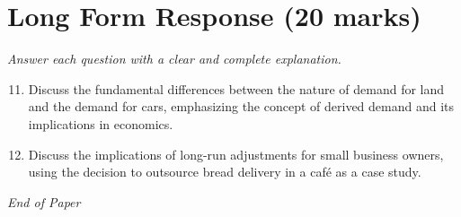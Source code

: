 \documentclass[12pt]{article}
\begin{document}
\section*{Long Form Response (20 marks)}
\textit{Answer each question with a clear and complete explanation.}
\begin{enumerate}[label=\arabic*.]
\setcounter{enumi}{10}
\item Discuss the fundamental differences between the nature of demand for land and the demand for cars, emphasizing the concept of derived demand and its implications in economics.
\item Discuss the implications of long-run adjustments for small business owners, using the decision to outsource bread delivery in a café as a case study.
\end{enumerate}

\vfill
\noindent\textit{End of Paper}
\end{document}
